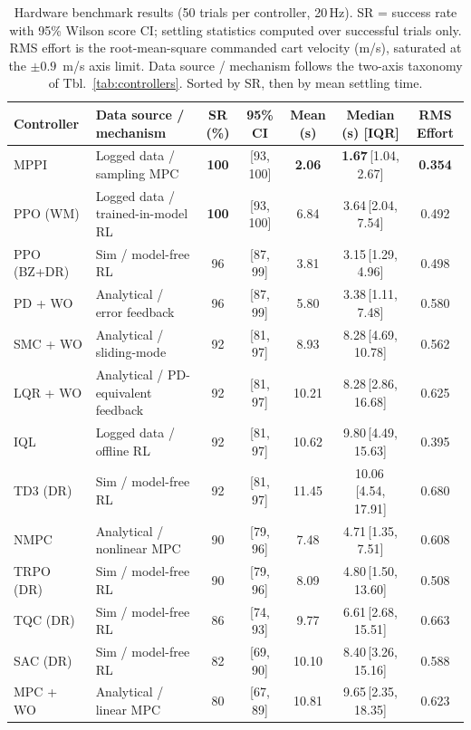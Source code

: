 \begin{table}[t]
\centering
\caption{Hardware benchmark results (50 trials per controller, 20\,Hz).
  SR = success rate with 95\% Wilson score CI; settling statistics computed over successful trials only.
  RMS effort is the root-mean-square commanded cart velocity (m/s),
  saturated at the $\pm 0.9$~m/s axis limit.
  Data source / mechanism follows the two-axis taxonomy of Tbl.~\ref{tab:controllers}.
  Sorted by SR, then by mean settling time.}
\label{tab:results}
\begin{tabular}{llccccc}
\toprule
\textbf{Controller} & \textbf{Data source / mechanism} & \textbf{SR (\%)} & \textbf{95\% CI}
  & \textbf{Mean (s)} & \textbf{Median (s) [IQR]} & \textbf{RMS Effort} \\
\midrule
MPPI         & Logged data / sampling MPC & \textbf{100} & [93, 100] & \textbf{2.06} & \textbf{1.67}\,[1.04, 2.67] & \textbf{0.354} \\
PPO (WM)     & Logged data / trained-in-model RL & \textbf{100} & [93, 100] & 6.84 & 3.64\,[2.04, 7.54] & 0.492 \\
PPO (BZ+DR)  & Sim / model-free RL    & 96 & [87, 99]   & 3.81 & 3.15\,[1.29, 4.96] & 0.498 \\
PD + WO      & Analytical / error feedback & 96 & [87, 99]  & 5.80 & 3.38\,[1.11, 7.48] & 0.580 \\
\midrule
SMC + WO     & Analytical / sliding-mode & 92 & [81, 97]   & 8.93  & 8.28\,[4.69, 10.78]  & 0.562 \\
LQR + WO     & Analytical / PD-equivalent feedback & 92 & [81, 97]   & 10.21 & 8.28\,[2.86, 16.68]  & 0.625 \\
IQL          & Logged data / offline RL   & 92 & [81, 97]   & 10.62 & 9.80\,[4.49, 15.63]  & 0.395 \\
TD3 (DR)     & Sim / model-free RL    & 92 & [81, 97]   & 11.45 & 10.06\,[4.54, 17.91] & 0.680 \\
NMPC         & Analytical / nonlinear MPC & 90 & [79, 96]   & 7.48  & 4.71\,[1.35, 7.51]   & 0.608 \\
TRPO (DR)    & Sim / model-free RL    & 90 & [79, 96]   & 8.09  & 4.80\,[1.50, 13.60]  & 0.508 \\
\midrule
TQC (DR)     & Sim / model-free RL    & 86 & [74, 93]   & 9.77  & 6.61\,[2.68, 15.51]  & 0.663 \\
SAC (DR)     & Sim / model-free RL    & 82 & [69, 90]   & 10.10 & 8.40\,[3.26, 15.16]  & 0.588 \\
MPC + WO     & Analytical / linear MPC & 80 & [67, 89]   & 10.81 & 9.65\,[2.35, 18.35]  & 0.623 \\
\bottomrule
\end{tabular}
\end{table}


